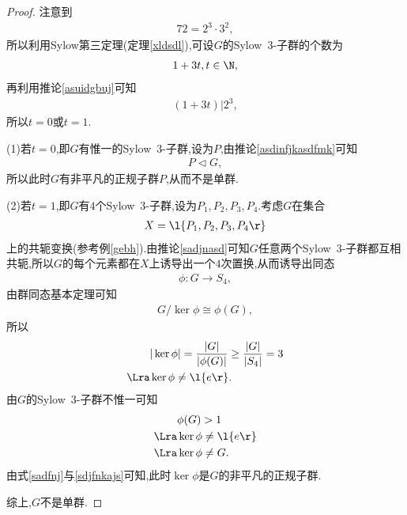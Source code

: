 \begin{proof}
    注意到\begin{align*}
        72=2^3\cdot3^2,
    \end{align*}所以利用Sylow第三定理(定理\ref{xldsdl}),可设$G$的Sylow\ $3$-子群的个数为\begin{align*}
        1+3t,t\in\N,
    \end{align*}再利用推论\ref{asuidgbuj}可知\begin{align*}
        (1+3t)|2^3,
    \end{align*}所以$t=0$或$t=1$.

    (1)若$t=0$,即$G$有惟一的Sylow\ $3$-子群,设为$P$,由推论\ref{asdinfjkasdfmk}可知\begin{align*}
        P\lhd G,
    \end{align*}所以此时$G$有非平凡的正规子群$P$,从而不是单群.

    (2)若$t=1$,即$G$有$4$个Sylow\ $3$-子群,设为$P_1,P_2,P_3,P_4$.考虑$G$在集合\begin{align*}
        X=\l\{P_1,P_2,P_3,P_4\r\}
    \end{align*}上的共轭变换(参考例\ref{gebh}).由推论\ref{sadjnasd}可知$G$任意两个Sylow\ $3$-子群都互相共轭,所以$G$的每个元素都在$X$上诱导出一个$4$次置换,从而诱导出同态\begin{align*}
        \phi:G\to S_4,
    \end{align*}由群同态基本定理可知\begin{align*}
        G/\ker\phi\cong\phi(G),
    \end{align*}所以\begin{align}
        &|\ker\phi|=\frac{|G|}{|\phi(G)|}\geq\frac{|G|}{|S_4|}=3\nonumber\\
        \Lra&\ker\phi\neq\l\{e\r\}.\label{sadfnj}
    \end{align}由$G$的Sylow\ $3$-子群不惟一可知\begin{align}
        &\phi(G)>1\nonumber\\
        \Lra&\ker\phi\neq\l\{e\r\}\nonumber\\
        \Lra&\ker\phi\neq G.\label{sdjfnkajs}
    \end{align}由式\eqref{sadfnj}与\eqref{sdjfnkajs}可知,此时$\ker\phi$是$G$的非平凡的正规子群.

    综上,$G$不是单群.
\end{proof}